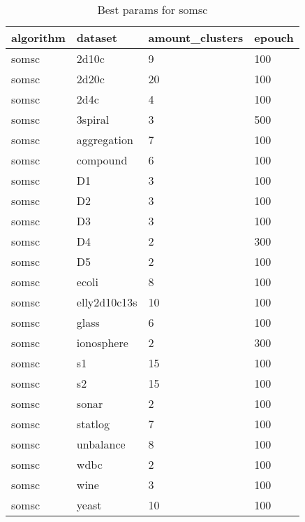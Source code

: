 \clearpage

\begin{table}[H]
\centering
\caption{Best params for somsc}
\label{S42_Table}
\begin{tabular}{|l|l|l|l|}
\hline
algorithm & dataset & amount\_clusters & epouch \\
\hline
somsc & 2d10c & 9 & 100 \\
\hline
somsc & 2d20c & 20 & 100 \\
\hline
somsc & 2d4c & 4 & 100 \\
\hline
somsc & 3spiral & 3 & 500 \\
\hline
somsc & aggregation & 7 & 100 \\
\hline
somsc & compound & 6 & 100 \\
\hline
somsc & D1 & 3 & 100 \\
\hline
somsc & D2 & 3 & 100 \\
\hline
somsc & D3 & 3 & 100 \\
\hline
somsc & D4 & 2 & 300 \\
\hline
somsc & D5 & 2 & 100 \\
\hline
somsc & ecoli & 8 & 100 \\
\hline
somsc & elly2d10c13s & 10 & 100 \\
\hline
somsc & glass & 6 & 100 \\
\hline
somsc & ionosphere & 2 & 300 \\
\hline
somsc & s1 & 15 & 100 \\
\hline
somsc & s2 & 15 & 100 \\
\hline
somsc & sonar & 2 & 100 \\
\hline
somsc & statlog & 7 & 100 \\
\hline
somsc & unbalance & 8 & 100 \\
\hline
somsc & wdbc & 2 & 100 \\
\hline
somsc & wine & 3 & 100 \\
\hline
somsc & yeast & 10 & 100 \\
\hline
\end{tabular}
\end{table}

\clearpage

